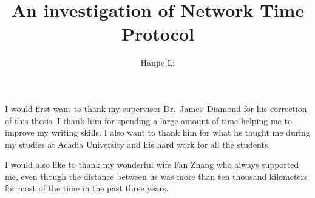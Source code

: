 

\title{An investigation of Network Time Protocol}
\author{Hanjie Li}







\firstThreePages


\Acknowledgments
I would first want to thank my supervisor Dr.~James~Diamond for his correction
of this thesis. I thank him for spending a large amount of time helping me to
improve my writing skills. I also want to thank him for what he taught me
during my studies at Acadia University and his hard work for all the students.

I would also like to thank my wonderful wife Fan Zhang who always supported me,
even though the distance between us was more than ten thousand kilometers for
most of the time in the past three years.

